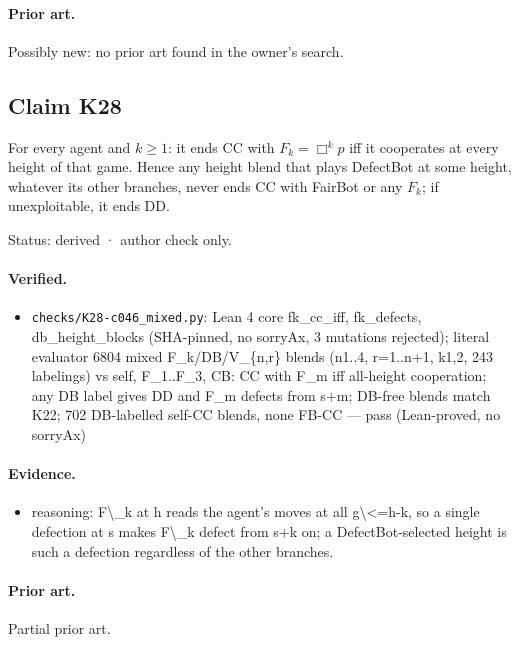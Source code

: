 \documentclass{article}
\begin{document}
\paragraph{Prior art.} Possibly new: no prior art found in the owner's search.

\subsection*{Claim K28}

For every agent and $k\ge1$: it ends CC with $F_k=\Box^kp$ iff it cooperates at every height of that game. Hence any height blend that plays DefectBot at some height, whatever its other branches, never ends CC with FairBot or any $F_k$; if unexploitable, it ends DD.

Status: derived · author check only.

\paragraph{Verified.}
\begin{itemize}
\item \texttt{checks/K28-c046\_mixed.py}: Lean 4 core fk\_cc\_iff, fk\_defects, db\_height\_blocks (SHA-pinned, no sorryAx, 3 mutations rejected); literal evaluator 6804 mixed F\_k/DB/V\_\{n,r\} blends (n1..4, r=1..n+1, k1,2, 243 labelings) vs self, F\_1..F\_3, CB: CC with F\_m iff all-height cooperation; any DB label gives DD and F\_m defects from s+m; DB-free blends match K22; 702 DB-labelled self-CC blends, none FB-CC --- pass (Lean-proved, no sorryAx)
\end{itemize}

\paragraph{Evidence.}
\begin{itemize}
\item reasoning: F\textbackslash{}\_k at h reads the agent's moves at all g\textbackslash{}\textless{}=h-k, so a single defection at s makes F\textbackslash{}\_k defect from s+k on; a DefectBot-selected height is such a defection regardless of the other branches.
\end{itemize}

\paragraph{Prior art.} Partial prior art.
\end{document}
